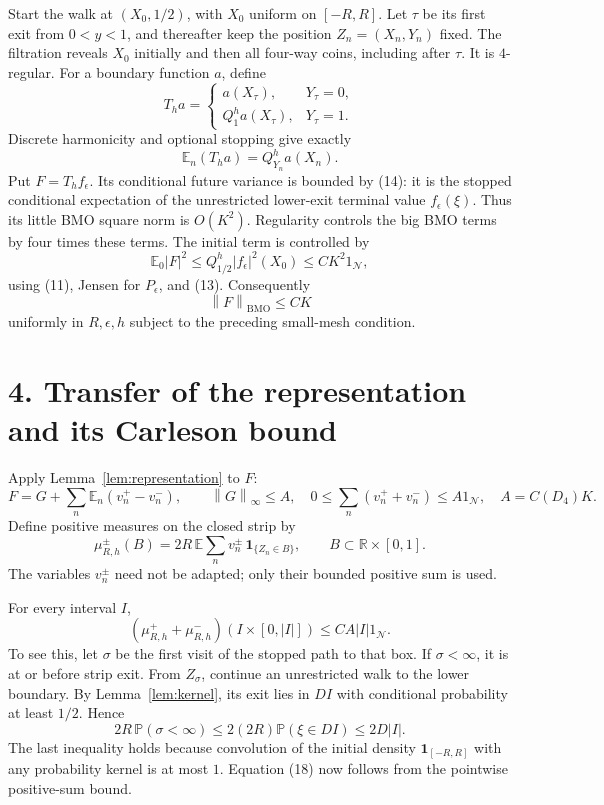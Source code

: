\documentclass[11pt]{article}
\newcommand{\N}{\mathcal N}
\newcommand{\E}{\mathbb E}
\newcommand{\BMO}{\mathrm{BMO}}
\newcommand{\R}{\mathbb R}
\newcommand{\norm}[1]{\left\|#1\right\|}
\begin{document}
Start the walk at \((X_0,1/2)\), with \(X_0\) uniform on \([-R,R]\).
Let \(\tau\) be its first exit from \(0<y<1\), and thereafter keep
the position \(Z_n=(X_n,Y_n)\) fixed. The filtration reveals \(X_0\)
initially and then all four-way coins, including after \(\tau\).
It is \(4\)-regular. For a boundary function \(a\), define
\[
 T_h a=
 \begin{cases}
 a(X_\tau),&Y_\tau=0,\\
 Q^h_1a(X_\tau),&Y_\tau=1.
 \end{cases}
\]
Discrete harmonicity and optional stopping give exactly
\[
 \E_n(T_h a)=Q^h_{Y_n}a(X_n).                    \tag{15}
\]
Put \(F=T_h f_\epsilon\).
Its conditional future variance is bounded by (14): it is the stopped
conditional expectation of the unrestricted lower-exit terminal value
\(f_\epsilon(\xi)\).
Thus its little BMO square norm is \(O(K^2)\).
Regularity controls the big BMO terms by four times these terms.
The initial term is controlled by
\[
 \E_0|F|^2\le Q^h_{1/2}|f_\epsilon|^2(X_0)\le C K^2 1_\N,
\]
using (11), Jensen for \(P_\epsilon\), and (13).
Consequently
\[
 \norm{F}_{\BMO}\le C K                         \tag{16}
\]
uniformly in \(R,\epsilon,h\) subject to the preceding small-mesh condition.

\section*{4. Transfer of the representation and its Carleson bound}
Apply Lemma~\ref{lem:representation} to \(F\):
\[
 F=G+\sum_n\E_n(v_n^+-v_n^-),\qquad
 \norm{G}_\infty\le A,\quad
 0\le\sum_n(v_n^++v_n^-)\le A1_\N,\quad A=C(D_4)K.
\]
Define positive measures on the closed strip by
\[
 \mu_{R,h}^\pm(B)
 =2R\,\E\sum_n v_n^\pm\,\mathbf1_{\{Z_n\in B\}},
 \qquad B\subset\R\times[0,1].                  \tag{17}
\]
The variables \(v_n^\pm\) need not be adapted; only their bounded
positive sum is used.

For every interval \(I\),
\[
 (\mu_{R,h}^++\mu_{R,h}^-)(I\times[0,|I|])
 \le C A |I|1_\N.                              \tag{18}
\]
To see this, let \(\sigma\) be the first visit of the stopped path to
that box. If \(\sigma<\infty\), it is at or before strip exit.
From \(Z_\sigma\), continue an unrestricted walk to the lower boundary.
By Lemma~\ref{lem:kernel}, its exit lies in \(DI\) with conditional
probability at least \(1/2\). Hence
\[
 2R\,\mathbb P(\sigma<\infty)
 \le 2(2R)\mathbb P(\xi\in DI)\le2D|I|.
\]
The last inequality holds because convolution of the initial density
\(\mathbf1_{[-R,R]}\) with any probability kernel is at most \(1\).
Equation (18) now follows from the pointwise positive-sum bound.
\end{document}
